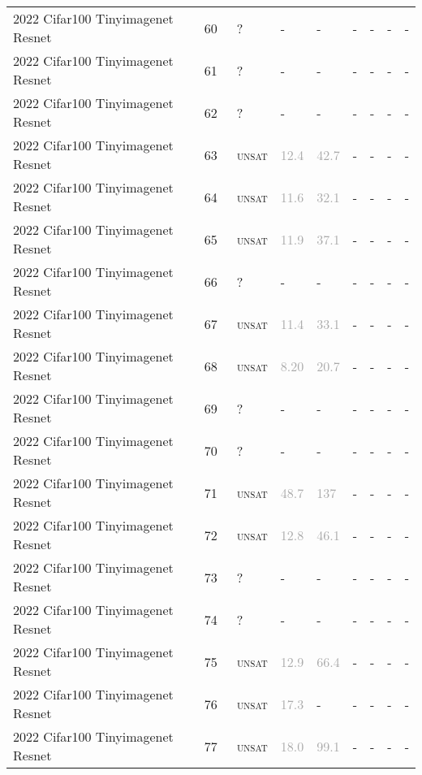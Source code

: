 \begin{center}
{\begin{longtable}{@{}lllllllll@{}}
2022 Cifar100 Tinyimagenet Resnet & 60 & ~? & - & - & - & - & - & - \\
2022 Cifar100 Tinyimagenet Resnet & 61 & ~? & - & - & - & - & - & - \\
2022 Cifar100 Tinyimagenet Resnet & 62 & ~? & - & - & - & - & - & - \\
2022 Cifar100 Tinyimagenet Resnet & 63 & ~\textsc{unsat} & \textcolor{darkgray}{12.4} & \textcolor{darkgray}{42.7} & - & - & - & - \\
2022 Cifar100 Tinyimagenet Resnet & 64 & ~\textsc{unsat} & \textcolor{darkgray}{11.6} & \textcolor{darkgray}{32.1} & - & - & - & - \\
2022 Cifar100 Tinyimagenet Resnet & 65 & ~\textsc{unsat} & \textcolor{darkgray}{11.9} & \textcolor{darkgray}{37.1} & - & - & - & - \\
2022 Cifar100 Tinyimagenet Resnet & 66 & ~? & - & - & - & - & - & - \\
2022 Cifar100 Tinyimagenet Resnet & 67 & ~\textsc{unsat} & \textcolor{darkgray}{11.4} & \textcolor{darkgray}{33.1} & - & - & - & - \\
2022 Cifar100 Tinyimagenet Resnet & 68 & ~\textsc{unsat} & \textcolor{darkgray}{8.20} & \textcolor{darkgray}{20.7} & - & - & - & - \\
2022 Cifar100 Tinyimagenet Resnet & 69 & ~? & - & - & - & - & - & - \\
2022 Cifar100 Tinyimagenet Resnet & 70 & ~? & - & - & - & - & - & - \\
2022 Cifar100 Tinyimagenet Resnet & 71 & ~\textsc{unsat} & \textcolor{darkgray}{48.7} & \textcolor{darkgray}{137} & - & - & - & - \\
2022 Cifar100 Tinyimagenet Resnet & 72 & ~\textsc{unsat} & \textcolor{darkgray}{12.8} & \textcolor{darkgray}{46.1} & - & - & - & - \\
2022 Cifar100 Tinyimagenet Resnet & 73 & ~? & - & - & - & - & - & - \\
2022 Cifar100 Tinyimagenet Resnet & 74 & ~? & - & - & - & - & - & - \\
2022 Cifar100 Tinyimagenet Resnet & 75 & ~\textsc{unsat} & \textcolor{darkgray}{12.9} & \textcolor{darkgray}{66.4} & - & - & - & - \\
2022 Cifar100 Tinyimagenet Resnet & 76 & ~\textsc{unsat} & \textcolor{darkgray}{17.3} & - & - & - & - & - \\
2022 Cifar100 Tinyimagenet Resnet & 77 & ~\textsc{unsat} & \textcolor{darkgray}{18.0} & \textcolor{darkgray}{99.1} & - & - & - & - \\

\end{longtable}}
\end{center}
